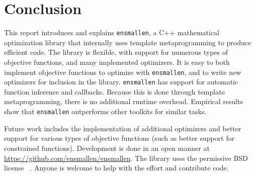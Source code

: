 \section{Conclusion}
\label{sec:conclusion}

This report introduces and explains {\tt ensmallen}, a C++ mathematical
optimization library that internally uses template metaprogramming to produce efficient
code.  The library is flexible, with support for numerous types of objective
functions, and many implemented optimizers.  It is easy to both implement
objective functions to optimize with {\tt ensmallen}, and to write new
optimizers for inclusion in the library.  {\tt ensmallen} has support for
automatic function inference and callbacks.  Because this is done through
template metaprogramming, there is no additional runtime overhead.
Empirical results show that {\tt ensmallen} outperforms other toolkits 
for similar tasks.

Future work includes the implementation of additional optimizers
and better support for various types of objective functions
(such as better support for constrained functions).
Development is done in an open manner at \mbox{\url{https://github.com/ensmallen/ensmallen}}.
The library uses the permissive BSD license~\cite{TODO} .
Anyone is welcome to help with the effort and contribute code.
